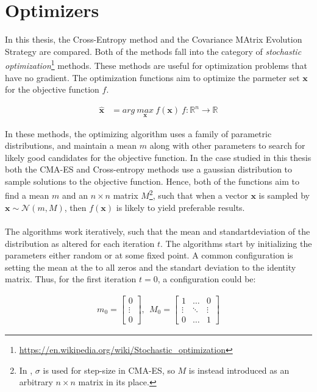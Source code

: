 \section{Optimizers}

In this thesis, the Cross-Entropy method and the Covariance MAtrix Evolution 
Strategy are compared. Both of the methods fall into the category of 
\textit{stochastic optimization}\footnote{\url{https://en.wikipedia.org/wiki/Stochastic_optimization}}
methods. These methods are useful for optimization problems that have no gradient.
The optimization functions aim to optimize the parmeter set $\textbf{x}$
for the objective function $f$.

\begin{align*}
\hat{\textbf{x}} &= arg \  \underset{\textbf{x}}{max} \  f(\textbf{x}) \ f : \mathbb{R}^{n} \rightarrow \mathbb{R}
\end{align*}

In these methods, the optimizing algorithm uses a family of parametric distributions,
and maintain a mean $m$ along with other parameters
to search for likely good candidates for the objective function.  In the case studied in this thesis
both the CMA-ES and Cross-entropy methods use a gaussian distribution to sample solutions to the objective function.
Hence, both of the functions aim to find a mean $m$ and an $n \times n$ matrix 
$M$\footnote{In \citep{hansen2011}, $\sigma$ is used for step-size in CMA-ES, so $M$ is instead introduced
as an arbitrary $n \times n$ matrix in its place.}, such that when
a vector $\textbf{x}$ is sampled by $\textbf{x} \sim \mathcal{N}\left( m, M \right)$, then $f(\textbf{x})$ 
is likely to yield preferable results.\\
\\
The algorithms work iteratively, such that the mean and standartdeviation of the distribution 
as altered for each iteration $t$.
The algorithms start by initializing the parameters either random or at some fixed point. A common 
configuration is setting the mean at the to all zeros and the standart deviation to the identity matrix.
Thus, for the first iteration $t = 0$, a configuration could be:

\begin{align*}
m_{0} =
\begin{bmatrix}
0\\
\vdots\\
0
\end{bmatrix},\ \ 
M_{0} = 
\begin{bmatrix}
1 & \hdots & 0\\
\vdots & \ddots & \vdots\\
0 & \hdots & 1
\end{bmatrix}
\end{align*}

